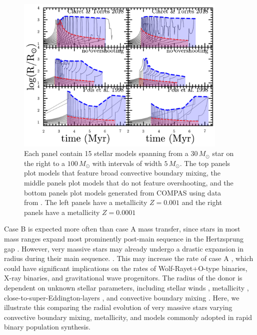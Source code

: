 \documentclass[twocolumn]{aastex63}
\begin{document}
\begin{figure}[htbp]
  \centering
  \includegraphics[width=0.9\textwidth]{radii}
  \caption{Each panel contain 15 stellar models spanning from a
    $30 \, M_{\odot}$ star on the right to a $100 \, M_{\odot}$ with
    intervals of width $5 \, M_{\odot}$. The top panels plot models
    that feature broad convective boundary mixing, the middle panels
    plot models that do not feature overshooting, and the bottom
    panels plot models generated from COMPAS using data from
    \cite{pols:98}. The left panels have a metallicity $Z=0.001$ and
    the right panels have a metallicity $Z=0.0001$}
  \label{fig:R_t_donor}
\end{figure}


Case B is expected more often than case A mass transfer, since stars
in most mass ranges expand most prominently post-main sequence in the
Hertzsprung gap \citep{vandenheuvel:69}. However, very massive stars
may already undergo a drastic expansion in radius during their main
sequence. \citep[e.g.,][]{sanyal:15, jiang:15, sabhahit:24}. This may
increase the rate of case A \citep{demink:08}, which could have
significant implications on the rates of Wolf-Rayet+O-type binaries,
X-ray binaries, and gravitational wave progenitors. The radius of the
donor is dependent on unknown stellar parameters, including stellar
winds \citep{renzo:17, josiek:24}, metallicity \citep{xin:22},
close-to-super-Eddington-layers \citep[e.g.,][]{joss:73, paxton:13,
  jiang: 15}, and convective boundary mixing \citep{anders:23,
  johnston:24}. Here, we illustrate this comparing the radial
evolution of very massive stars varying convective boundary mixing,
metallicity, and models commonly adopted in rapid binary population
synthesis.
\end{document}
